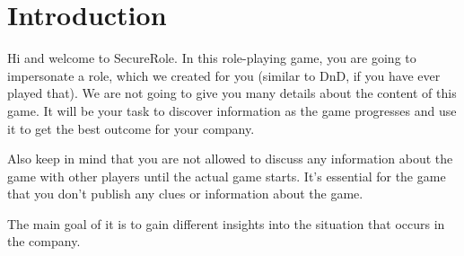 \section*{Introduction}
Hi and welcome to SecureRole. In this role-playing game, you are going to impersonate a role, which we created for you (similar to DnD, if you have ever played that).
We are not going to give you many details about the content of this game.
It will be your task to discover information as the game progresses and use it to get the best outcome for your company.

Also keep in mind that you are not allowed to discuss any information about the game with other players until the actual game starts.
It's essential for the game that you don't publish any clues or information about the game.

The main goal of it is to gain different insights into the situation that occurs in the company.